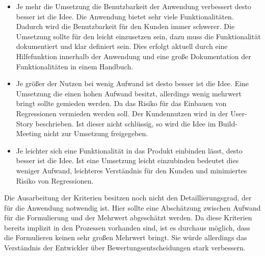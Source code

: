 \begin{itemize}
    \item Je mehr die Umsetzung die Benutzbarkeit der Anwendung verbessert desto besser ist die Idee. Die Anwendung bietet sehr viele Funktionalitäten. Dadurch 
    wird die Benutzbarkeit für den Kunden immer schwerer. Die Umsetzung sollte für den leicht einzusetzen sein, dazu muss die Funktionalität dokumentiert und klar definiert sein. 
    Dies erfolgt aktuell durch eine Hilfefunktion innerhalb der Anwendung und eine große Dokumentation der Funktionalitäten in einem Handbuch.
    \item Je größer der Nutzen bei wenig Aufwand ist desto besser ist die Idee. Eine Umsetzung die einen hohen Aufwand besitzt, allerdings wenig mehrwert bringt sollte 
    gemieden werden. Da das Risiko für das Einbauen von Regressionen vermieden werden soll. Der Kundennutzen wird in der User-Story beschrieben. Ist dieser nicht schlüssig, 
    so wird die Idee im Build-Meeting nicht zur Umsetzung freigegeben. 
    \item Je leichter sich eine Funktionalität in das Produkt einbinden lässt, desto besser ist die Idee. Ist eine Umsetzung leicht einzubinden bedeutet dies 
    weniger Aufwand, leichteres Verständnis für den Kunden und minimiertes Risiko von Regressionen.
\end{itemize}

Die Ausarbeitung der Kriterien besitzen noch nicht den Detaillierungsgrad, der für die Anwendung notwendig ist. Hier sollte eine Abschätzung zwischen 
Aufwand für die Formulierung und der Mehrwert abgeschätzt werden. Da diese Kriterien bereits implizit in den Prozessen vorhanden sind, ist es durchaus 
möglich, dass die Formulieren keinen sehr großen Mehrwert bringt. Sie würde allerdings das Verständnis der Entwickler über Bewertungsentscheidungen stark 
verbessern. 